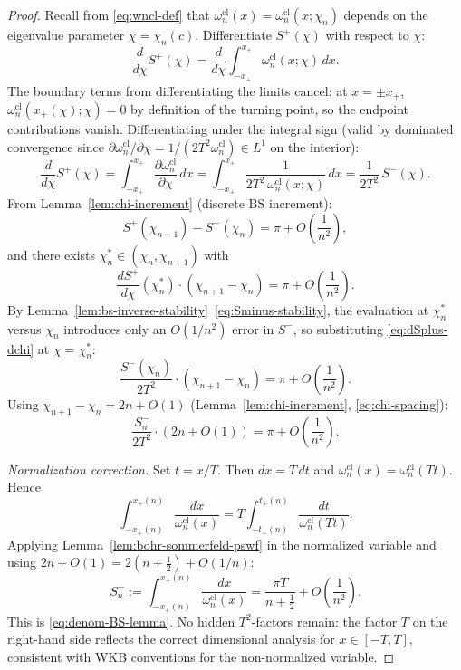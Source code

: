 \documentclass[12pt,a4paper]{amsart}
\newcommand{\wncl}{\omega_n^{\mathrm{cl}}}
\begin{document}
\begin{proof}
Recall from \eqref{eq:wncl-def} that
$\wncl(x) = \wncl(x;\chi_n)$
depends on the eigenvalue parameter $\chi = \chi_n(c)$.
Differentiate $S^+(\chi)$ with respect to $\chi$:
\begin{equation}\label{eq:diff-chi}
  \frac{d}{d\chi} S^+(\chi)
  = \frac{d}{d\chi}\int_{-x_+}^{x_+} \wncl(x;\chi)\,dx.
\end{equation}
The boundary terms from differentiating the limits cancel:
at $x = \pm x_+$, $\wncl(x_+(\chi);\chi) = 0$ by definition
of the turning point, so the endpoint contributions vanish.
Differentiating under the integral sign (valid by dominated
convergence since $\partial\wncl/\partial\chi
= 1/(2T^2\wncl) \in L^1$ on the interior):
\begin{equation}\label{eq:dSplus-dchi}
  \frac{d}{d\chi} S^+(\chi)
  = \int_{-x_+}^{x_+} \frac{\partial\wncl}{\partial\chi}\,dx
  = \int_{-x_+}^{x_+} \frac{1}{2T^2\,\wncl(x;\chi)}\,dx
  = \frac{1}{2T^2}\,S^-(\chi).
\end{equation}
From Lemma~\ref{lem:chi-increment} (discrete BS increment):
\[
  S^+(\chi_{n+1}) - S^+(\chi_n) = \pi + O\!\left(\frac{1}{n^2}\right),
\]
and there exists $\chi_n^* \in (\chi_n, \chi_{n+1})$ with
\[
  \frac{dS^+}{d\chi}(\chi_n^*) \cdot (\chi_{n+1} - \chi_n)
  = \pi + O\!\left(\frac{1}{n^2}\right).
\]
By Lemma~\ref{lem:bs-inverse-stability}~\eqref{eq:Sminus-stability},
the evaluation at $\chi_n^*$ versus $\chi_n$ introduces only
an $O(1/n^2)$ error in $S^-$, so substituting
\eqref{eq:dSplus-dchi} at $\chi = \chi_n^*$:
\[
  \frac{S^-(\chi_n)}{2T^2} \cdot (\chi_{n+1} - \chi_n)
  = \pi + O\!\left(\frac{1}{n^2}\right).
\]
Using $\chi_{n+1} - \chi_n = 2n + O(1)$
(Lemma~\ref{lem:chi-increment}, \eqref{eq:chi-spacing}):
\[
  \frac{S_n^-}{2T^2}\cdot(2n + O(1))
  = \pi + O\!\left(\frac{1}{n^2}\right).
\]

\textit{Normalization correction.}
Set $t = x/T$. Then $dx = T\,dt$ and
$\wncl(x) = \wncl(Tt)$.
Hence
\[
  \int_{-x_+(n)}^{x_+(n)} \frac{dx}{\wncl(x)}
  = T \int_{-t_+(n)}^{t_+(n)} \frac{dt}{\wncl(Tt)}.
\]
Applying Lemma~\ref{lem:bohr-sommerfeld-pswf} in the
normalized variable and using
$2n + O(1) = 2(n+\tfrac{1}{2}) + O(1/n)$:
\begin{equation}\label{eq:Sminus-final}
  S_n^- := \int_{-x_+(n)}^{x_+(n)} \frac{dx}{\wncl(x)}
  = \frac{\pi T}{n + \tfrac{1}{2}}
    + O\!\left(\frac{1}{n^2}\right).
\end{equation}
This is \eqref{eq:denom-BS-lemma}. No hidden $T^2$-factors
remain: the factor $T$ on the right-hand side reflects
the correct dimensional analysis for $x \in [-T,T]$,
consistent with WKB conventions for the non-normalized variable.
\end{proof}
\end{document}
